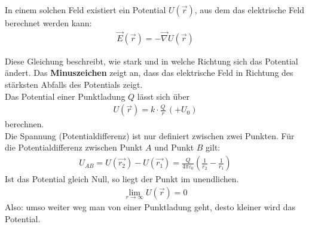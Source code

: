 \documentclass{scrartcl}
\begin{document}
\noindent In einem solchen Feld existiert ein Potential \( U(\vec{r}) \), aus dem das elektrische Feld berechnet werden kann:
\begin{align}
\vec{E}(\vec{r}) = -\vec{\nabla} U(\vec{r})
\end{align}

Diese Gleichung beschreibt, wie stark und in welche Richtung sich das Potential ändert.
Das \textbf{Minuszeichen} zeigt an, dass das elektrische Feld in Richtung des stärksten Abfalls des Potentials zeigt.\\

\noindent Das Potential einer Punktladung $Q$ lässt sich über 
\begin{align}
    U(\vec{r})=k\cdot\frac{Q}{r}\, \left(+U_0\right)
\end{align}
berechnen.\\

\noindent Die Spannung (Potentialdifferenz) ist nur definiert zwischen zwei Punkten.
Für die Potentialdifferenz zwischen Punkt $A$ und Punkt $B$ gilt:
\begin{align}
    U_{AB}=U(\vec{r_2})-U(\vec{r_1})=\frac{Q}{4\pi\varepsilon_0}\left(\frac{1}{r_2}-\frac{1}{r_1}\right)
\end{align}
Ist das Potential gleich Null, so liegt der Punkt im unendlichen. 
\begin{align}
    \lim_{r\to\infty}U(\vec{r})=0
\end{align}
Also: umso weiter weg man von einer Punktladung geht, desto kleiner wird das Potential.
\end{document}
